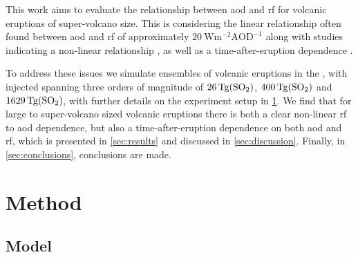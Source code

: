 \documentclass{ametsocV6.1}
\newcommand{\iso}[1][i]{{#1}njected \ce{SO2}}
\begin{document}

This work aims to evaluate the relationship between \gls{aod} and \gls{rf} for volcanic
eruptions of super-volcano size. This is considering the linear relationship often found
between \gls{aod} and \gls{rf} of approximately
\(\SI{20}{\watt\metre^{-2}\mathrm{AOD}^{-1}}\) \citep{gregory2016, marshall2020,
  mills2017, myhre2013} along with studies indicating a non-linear relationship
\citep{niemeier2015}, as well as a time-after-eruption dependence \citep{marshall2020}.

To address these issues we simulate ensembles of volcanic eruptions in the
, with \iso{} spanning three orders of magnitude of
\(\SI{26}{\tera\gram(\ce{SO2})}\), \(\SI{400}{\tera\gram(\ce{SO2})}\) and
\(\SI{1629}{\tera\gram(\ce{SO2})}\), with further details on the experiment setup in
\ref{sec:method}. We find that for large to super-volcano sized volcanic eruptions there
is both a clear non-linear \gls{rf} to \gls{aod} dependence, but also a
time-after-eruption dependence on both \gls{aod} and \gls{rf}, which is presented in
\ref{sec:results} and discussed in \ref{sec:discussion}. Finally, in
\ref{sec:conclusions}, conclusions are made.

\section{Method}\label{sec:method}

\subsection{Model}
\end{document}
